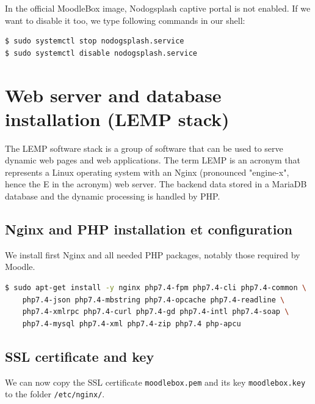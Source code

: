 \documentclass[12pt]{article}
\begin{document}
In the official MoodleBox image, Nodogsplash captive portal is not enabled.
If we want to disable it too, we type following commands in our shell:
\begin{lstlisting}[language=bash]
$ sudo systemctl stop nodogsplash.service
$ sudo systemctl disable nodogsplash.service
\end{lstlisting}

\section{Web server and database installation (LEMP stack)}

The LEMP software stack is a group of software that can be used to serve dynamic web pages and web applications.
The term LEMP is an acronym that represents a Linux operating system with an Nginx (pronounced "engine-x", hence the E in the acronym) web server.
The backend data stored in a MariaDB database and the dynamic processing is handled by PHP.

\subsection{Nginx and PHP installation et configuration}\label{ssec-nginx-php-installation}

We install first Nginx and all needed PHP packages, notably those required by Moodle.

\begin{lstlisting}[language=bash]
$ sudo apt-get install -y nginx php7.4-fpm php7.4-cli php7.4-common \
    php7.4-json php7.4-mbstring php7.4-opcache php7.4-readline \
    php7.4-xmlrpc php7.4-curl php7.4-gd php7.4-intl php7.4-soap \
    php7.4-mysql php7.4-xml php7.4-zip php7.4 php-apcu
\end{lstlisting}

\subsection{SSL certificate and key}

We can now copy the SSL certificate \lstinline{moodlebox.pem} and its key \lstinline{moodlebox.key} to the folder \lstinline{/etc/nginx/}.
\end{document}
